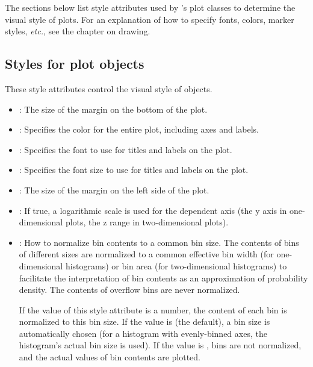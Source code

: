The sections below list style attributes used by \pyhep's plot classes
to determine the visual style of plots.  For an explanation of how to
specify fonts, colors, marker styles, \textit{etc.}, see the chapter on
drawing. 

\subsection{Styles for plot objects}

These style attributes control the visual style of  objects.

\begin{itemize}
 \item {}: The size of the margin on the bottom of
 the plot.

 \item {}: Specifies the color for the entire plot,
 including axes and labels.

 \item {}: Specifies the font to use for titles and labels
 on the plot.

 \item {}: Specifies the font size to use for titles and
 labels on the plot.

 \item {}: The size of the margin on the left side of
 the plot.

 \item {}: If true, a logarithmic scale is used for the
 dependent axis (the y axis in one-dimensional plots, the z range in
 two-dimensional plots).

 \item {}: How to normalize bin contents to a
 common bin size.  The contents of bins of different sizes are
 normalized to a common effective bin width (for one-dimensional
 histograms) or bin area (for two-dimensional histograms) to facilitate
 the interpretation of bin contents as an approximation of probability
 density.  The contents of overflow bins are never normalized.

 If the value of this style attribute is a number, the content of each
 bin is normalized to this bin size.  If the value is  (the
 default), a bin size is automatically chosen (for a histogram with
 evenly-binned axes, the histogram's actual bin size is used).  If the
 value is , bins are not normalized, and the actual values of
 bin contents are plotted.


\end{itemize}
